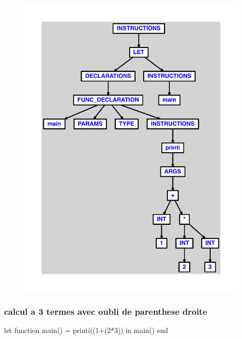 \documentclass{article}
\begin{document}
\begin{figure}[H]\centering\includegraphics[max width=\textwidth]{ast/ast_29.pdf}\end{figure}\subsubsection{calcul a 3 termes avec oubli de parenthese droite}
\begin{verbatimtab}
let function main() = printi((1+(2*3)) in main() end
\end{verbatimtab}
\end{document}
